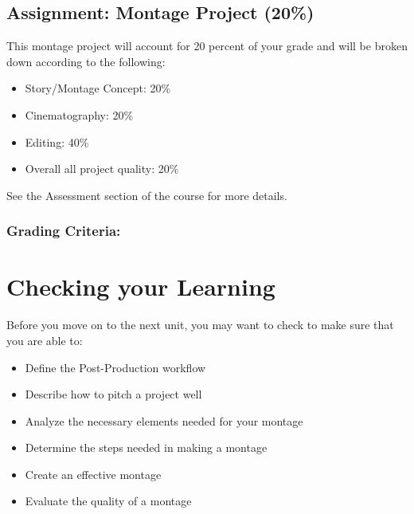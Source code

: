 \documentclass[
]{book}
\providecommand{\tightlist}{%
  \setlength{\itemsep}{0pt}\setlength{\parskip}{0pt}}
\begin{document}
\begin{assessment}
\hypertarget{assignment-montage-project-20}{%
\subsection*{Assignment: Montage Project (20\%)}\label{assignment-montage-project-20}}

This montage project will account for 20 percent of your grade and will be broken down according to the following:

\begin{itemize}
\tightlist
\item
  Story/Montage Concept: 20\%\\
\item
  Cinematography: 20\%\\
\item
  Editing: 40\%\\
\item
  Overall all project quality: 20\%
\end{itemize}

See the Assessment section of the course for more details.

\hypertarget{grading-criteria-4}{%
\subsubsection*{Grading Criteria:}\label{grading-criteria-4}}
\end{assessment}

\hypertarget{checking-your-learning-6}{%
\section*{Checking your Learning}\label{checking-your-learning-6}}

\begin{progress}
Before you move on to the next unit, you may want to check to make sure that you are able to:

\begin{itemize}
\tightlist
\item
  Define the Post-Production workflow\\
\item
  Describe how to pitch a project well\\
\item
  Analyze the necessary elements needed for your montage\\
\item
  Determine the steps needed in making a montage\\
\item
  Create an effective montage\\
\item
  Evaluate the quality of a montage
\end{itemize}
\end{progress}
\end{document}
